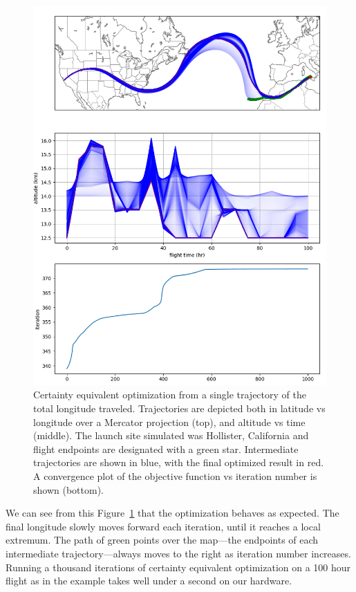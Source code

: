 \documentclass[11pt]{scrartcl} %
\begin{document}
\begin{figure}
\includegraphics[width=1\linewidth]{certaintyeq.png}
\caption{Certainty equivalent optimization from a single trajectory of the total longitude traveled. Trajectories are depicted both in latitude vs longitude over a Mercator projection (top), and altitude vs time (middle). The launch site simulated was Hollister, California and flight endpoints are designated with a green star. Intermediate trajectories are shown in blue, with the final optimized result in red. A convergence plot of the objective function vs iteration number is shown (bottom).}
\label{ce}
\end{figure}

We can see from this Figure~\ref{ce} that the optimization behaves as expected. The final longitude slowly moves forward each iteration, until it reaches a local extremum. The path of green points over the map---the endpoints of each intermediate trajectory---always moves to the right as iteration number increases. Running a thousand iterations of certainty equivalent optimization on a 100 hour flight as in the example takes well under a second on our hardware.
\end{document}
